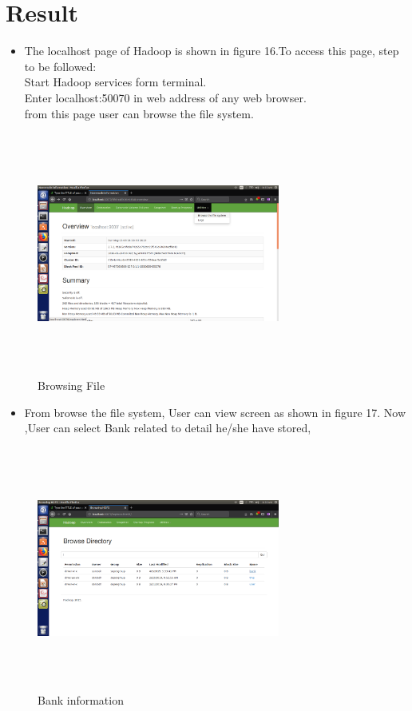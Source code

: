 \section{Result}
\begin{itemize}
    \item The localhost page of Hadoop is shown in figure 16.To access this page, step to be followed:\\
Start Hadoop services form terminal.\\
Enter localhost:50070 in web address of any web browser.\\
from this page user can browse the file system.
\end{itemize}
\begin{figure}[htb]
\centering
\includegraphics[width=8cm,height=8cm]{1stp.png}
    \caption{Browsing File}
\end{figure} \newpage
\begin{itemize}
    
\item  From browse the file system, User can view screen as shown in figure 17. Now ,User can select Bank related to detail he/she have stored,

\end{itemize}
\begin{figure}[htb]
\centering
\includegraphics[width=8cm,height=8cm]{2ndp.png}
    \caption{Bank information}
\end{figure} \newpage
